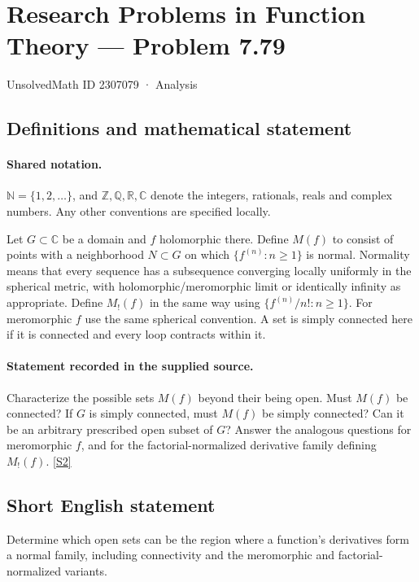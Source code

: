 \documentclass[11pt]{article}
\newcommand{\sref}[2]{\hyperlink{source:#1:#2}{[S#2]}}
\begin{document}
\setcounter{section}{2307078}
\section{Research Problems in Function Theory — Problem 7.79}\label{2307079}
{\small\sffamily UnsolvedMath ID 2307079 · Analysis}
\subsection{Definitions and mathematical statement}

\paragraph{Shared notation.}$\mathbb N=\{1,2,\ldots\}$, and $\mathbb Z,\mathbb Q,\mathbb R,\mathbb C$ denote the integers, rationals, reals and complex numbers. Any other conventions are specified locally.


Let $G\subset\mathbb C$ be a domain and $f$ holomorphic there. Define $M(f)$ to consist of points with a neighborhood $N\subset G$ on which $\{f^{(n)}:n\ge1\}$ is normal. Normality means that every sequence has a subsequence converging locally uniformly in the spherical metric, with holomorphic/meromorphic limit or identically infinity as appropriate. Define $M_!(f)$ in the same way using $\{f^{(n)}/n!:n\ge1\}$. For meromorphic $f$ use the same spherical convention. A set is simply connected here if it is connected and every loop contracts within it.
\paragraph{Statement recorded in the supplied source.}
Characterize the possible sets $M(f)$ beyond their being open. Must $M(f)$ be connected? If $G$ is simply connected, must $M(f)$ be simply connected? Can it be an arbitrary prescribed open subset of $G$? Answer the analogous questions for meromorphic $f$, and for the factorial-normalized derivative family defining $M_!(f)$. \sref{2307079}{2}
\subsection{Short English statement}
Determine which open sets can be the region where a function’s derivatives form a normal family, including connectivity and the meromorphic and factorial-normalized variants.
\end{document}
